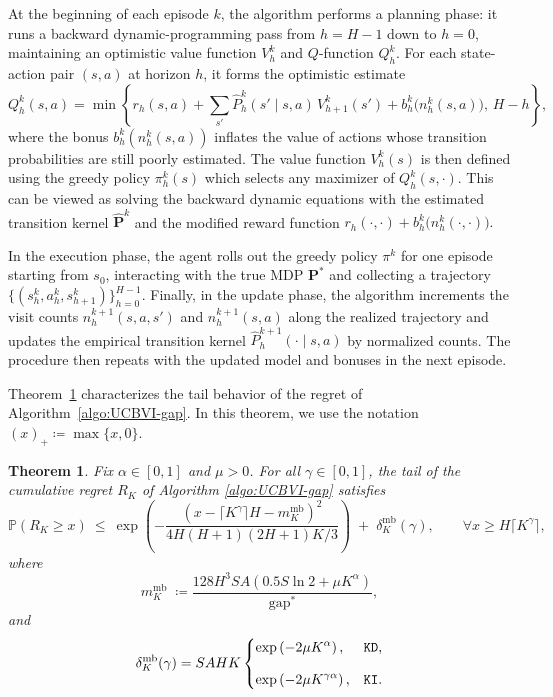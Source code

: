 \documentclass[11pt]{article}
\newcommand{\pp}{\boldsymbol{P}}
\newcommand{\PP}{\mathbb{P}}
\newcommand{\KD} {\texttt{KD}}
\newcommand{\KI} {\texttt{KI}}
\newtheorem{theorem}{Theorem}
\newcommand{\gapstar}{\mathrm{gap}^*}
\begin{document}
At the beginning of each episode $k$, the algorithm performs a planning phase: it runs a backward dynamic-programming pass from $h=H-1$ down to $h=0$, maintaining an optimistic value function $V_h^k$ and $Q$-function $Q_h^k$. For each state-action pair $(s,a)$ at horizon $h$, it forms the optimistic estimate
\[
Q_h^k(s,a)
=
\min\left\{r_h(s,a)+\sum_{s'}\hat P_h^k(s'\mid s,a)\,V_{h+1}^k(s')+b_h^k\big(n_h^k(s,a)\big),\,H-h\right\},
\]
where the bonus $b_h^k(n_h^k(s,a))$ inflates the value of actions whose transition probabilities are still poorly estimated. The value function $V_h^k(s)$ is then defined using the greedy policy $\pi_h^k(s)$ which selects any maximizer of $Q_h^k(s,\cdot)$. This can be viewed as solving the backward dynamic equations with the estimated transition kernel $\hat{\pp}^k$ and the modified reward function $r_h(\cdot,\cdot) + b_h^k\big(n_h^k(\cdot,\cdot)\big).$

In the execution phase, the agent rolls out the greedy policy $\pi^k$ for one episode starting from $s_0$, interacting with the true MDP $\pp^*$ and collecting a trajectory $\{(s_h^k,a_h^k,s_{h+1}^k)\}_{h=0}^{H-1}$. Finally, in the update phase, the algorithm increments the visit counts $n_h^{k+1}(s,a,s')$ and $n_h^{k+1}(s,a)$ along the realized trajectory and updates the empirical transition kernel $\hat P_h^{k+1}(\cdot\mid s,a)$ by normalized counts. The procedure then repeats with the updated model and bonuses in the next episode.

Theorem~\ref{thm:tailGap-UCBVI} characterizes the tail behavior of the regret of Algorithm~\ref{algo:UCBVI-gap}. In this theorem, we use the notation $(x)_+ \coloneqq \max\{x,0\}$.

\begin{theorem}
\label{thm:tailGap-UCBVI}
Fix $\alpha\in[0,1]$ and $\mu>0$. For all $\gamma \in [0,1]$, the tail of the cumulative regret $R_K$ of Algorithm \ref{algo:UCBVI-gap} satisfies
\[
\PP(R_K\ge x)
\ \le\
\exp \left( - \frac{(x-\lceil K^\gamma\rceil H - m_K^{\mathrm{mb}})^2}{4H(H+1)(2H+1)K/3}\right)
\;+\;\delta_K^{\mathrm{mb}}(\gamma), \qquad \forall x\geq H\lceil K^\gamma\rceil,
\]
where
\begin{equation}
\label{eq:mk-gap-UCBVI}
m_K^{\mathrm{mb}}
\;\coloneqq\frac{128 H^3 S A (0.5 S \ln 2 + \mu K^\alpha)}{\gapstar},
\end{equation} 
and 
\begin{align}\label{eq:delta_K_K}
    \delta_K^{\mathrm{mb}}(\gamma) = S A H K
    \begin{cases}
        \displaystyle \exp\left(- 2\mu K^{\alpha} \right),
        & \text{\KD}, \\[2ex]
        \displaystyle \exp\left(-2\mu K^{\gamma\alpha}\right),
        & \text{\KI}.
    \end{cases} 
\end{align}
\end{theorem}
\end{document}
